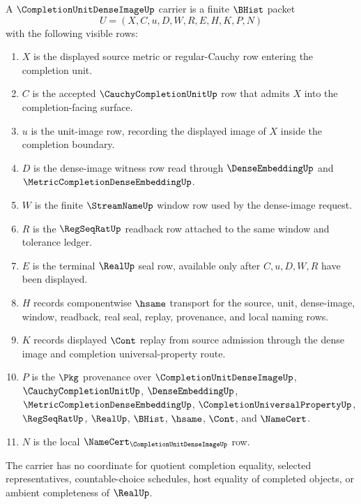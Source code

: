\begin{definition}
\label{def:completion-unit-dense-image-carrier}
A $\CompletionUnitDenseImageUp$ carrier is a finite $\BHist$ packet
$$
U=(X,C,u,D,W,R,E,H,K,P,N)
$$
with the following visible rows:
\begin{enumerate}
\item $X$ is the displayed source metric or regular-Cauchy row entering the completion unit.
\item $C$ is the accepted $\CauchyCompletionUnitUp$ row that admits $X$ into the completion-facing surface.
\item $u$ is the unit-image row, recording the displayed image of $X$ inside the completion boundary.
\item $D$ is the dense-image witness row read through $\DenseEmbeddingUp$ and $\MetricCompletionDenseEmbeddingUp$.
\item $W$ is the finite $\StreamNameUp$ window row used by the dense-image request.
\item $R$ is the $\RegSeqRatUp$ readback row attached to the same window and tolerance ledger.
\item $E$ is the terminal $\RealUp$ seal row, available only after $C,u,D,W,R$ have been displayed.
\item $H$ records componentwise $\hsame$ transport for the source, unit, dense-image, window, readback, real seal, replay, provenance, and local naming rows.
\item $K$ records displayed $\Cont$ replay from source admission through the dense image and completion universal-property route.
\item $P$ is the $\Pkg$ provenance over $\CompletionUnitDenseImageUp$, $\CauchyCompletionUnitUp$, $\DenseEmbeddingUp$, $\MetricCompletionDenseEmbeddingUp$, $\CompletionUniversalPropertyUp$, $\RegSeqRatUp$, $\RealUp$, $\BHist$, $\hsame$, $\Cont$, and $\NameCert$.
\item $N$ is the local $\NameCert_{\CompletionUnitDenseImageUp}$ row.
\end{enumerate}
The carrier has no coordinate for quotient completion equality, selected representatives, countable-choice schedules, host equality of completed objects, or ambient completeness of $\RealUp$.
\end{definition}

